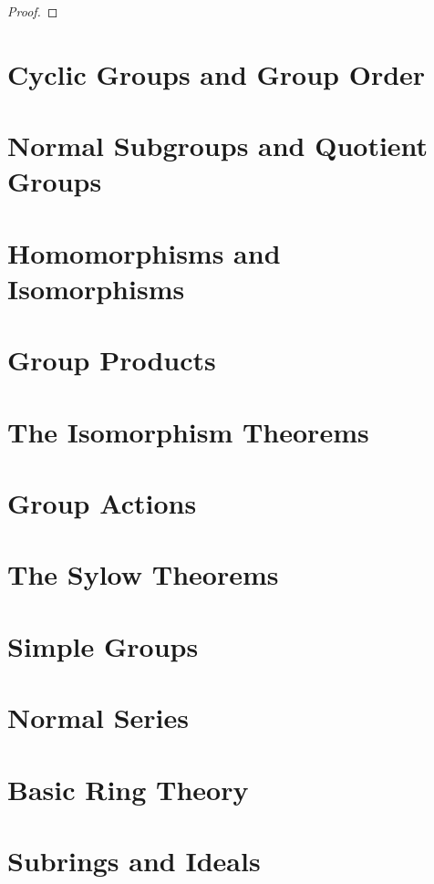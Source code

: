 \documentclass[12pt]{extarticle}
\theoremstyle{definition}
\begin{document}
\begin{proof}

\end{proof}


\section{Cyclic Groups and Group Order}

\section{Normal Subgroups and Quotient Groups}

\section{Homomorphisms and Isomorphisms}

\section{Group Products}

\section{The Isomorphism Theorems}

\section{Group Actions}

\section{The Sylow Theorems}

\section{Simple Groups}

\section{Normal Series}

\section{Basic Ring Theory}

\section{Subrings and Ideals}
\end{document}
